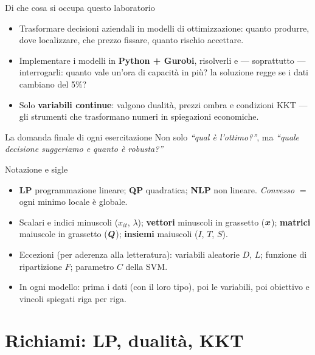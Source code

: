\documentclass[11pt,aspectratio=169]{beamer}
\begin{document}
\begin{frame}{Di che cosa si occupa questo laboratorio}
\begin{itemize}
  \item Trasformare \alert{decisioni aziendali} in modelli di ottimizzazione:
        quanto produrre, dove localizzare, che prezzo fissare, quanto rischio accettare.
  \item Implementare i modelli in \textbf{Python + Gurobi}, risolverli e --- soprattutto ---
        \alert{interrogarli}: quanto vale un'ora di capacità in più? la soluzione regge se
        i dati cambiano del 5\%?
  \item Solo \textbf{variabili continue}: valgono dualità, prezzi ombra e condizioni KKT ---
        gli strumenti che trasformano numeri in spiegazioni economiche.
\end{itemize}
\begin{block}{La domanda finale di ogni esercitazione}
Non solo \emph{``qual è l'ottimo?''}, ma \emph{``quale decisione suggeriamo e quanto è robusta?''}
\end{block}
\end{frame}

\begin{frame}{Notazione e sigle}
\begin{itemize}
  \item \textbf{LP} programmazione lineare; \textbf{QP} quadratica; \textbf{NLP} non lineare.
        \emph{Convesso} $=$ ogni minimo locale è globale.
  \item Scalari e indici minuscoli ($x_{it}$, $\lambda$); \textbf{vettori} minuscoli in
        grassetto ($\boldsymbol{x}$); \textbf{matrici} maiuscole in grassetto ($\boldsymbol{Q}$);
        \textbf{insiemi} maiuscoli ($I$, $T$, $S$).
  \item Eccezioni (per aderenza alla letteratura): variabili aleatorie $D$, $L$;
        funzione di ripartizione $F$; parametro $C$ della SVM.
  \item In ogni modello: prima i \alert{dati} (con il loro tipo), poi le
        \alert{variabili}, poi obiettivo e vincoli spiegati riga per riga.
\end{itemize}
\end{frame}

\section{Richiami: LP, dualità, KKT}
\end{document}

